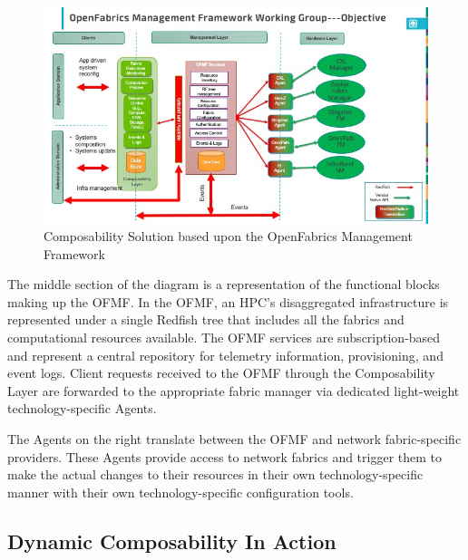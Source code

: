 \begin{figure}[ComposableSolution]
  \centerline{\includegraphics[width=\columnwidth]{ComposabilityHL_Diagram.jpeg}}
  \caption{Composability Solution based upon the OpenFabrics Management Framework}
  \label{fig:ofmf}
\end{figure}

The middle section of the diagram is a representation of the functional blocks making up the OFMF.  In the OFMF, an HPC's disaggregated infrastructure is represented under a single Redfish tree that includes all the fabrics and computational resources available. The OFMF services are subscription-based and represent a central repository for telemetry information, provisioning, and event logs.  Client requests received to the OFMF through the Composability Layer are forwarded to the appropriate fabric manager via dedicated light-weight technology-specific Agents. 

The Agents on the right translate between the OFMF and network fabric-specific providers.  These Agents provide access to network fabrics and trigger them to make the actual changes to their resources in their own technology-specific manner with their own technology-specific configuration tools.  

\subsection{Dynamic Composability In Action}



